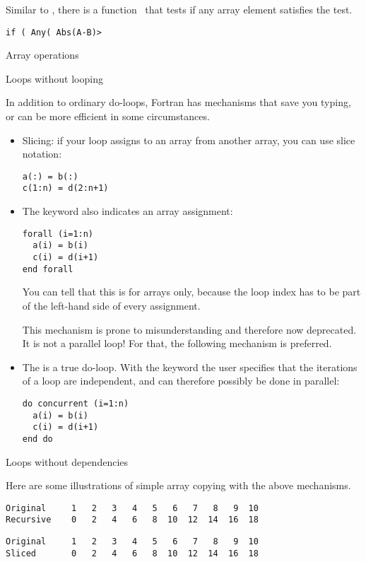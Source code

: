 Similar to , there is a function~ that tests
if any array element satisfies the test.
\begin{verbatim}
if ( Any( Abs(A-B)>
\end{verbatim}

 {Array operations}

 {Loops without looping}

In addition to ordinary do-loops, Fortran has mechanisms that save you
typing, or can be more efficient in some circumstances.
\begin{itemize}
\item Slicing: if your loop assigns to an array from another array,
  you can use slice notation:
\begin{verbatim}
a(:) = b(:)
c(1:n) = d(2:n+1)
\end{verbatim}
\item The  keyword also indicates an array assignment:
\begin{verbatim}
forall (i=1:n)
  a(i) = b(i)
  c(i) = d(i+1)
end forall
\end{verbatim}
You can tell that this is for arrays only, because the loop index has
to be part of the left-hand side of every assignment.

This mechanism is prone to misunderstanding and therefore now
deprecated.
It is not a parallel loop! For that, the following mechanism is preferred.
\item The  is a true do-loop. With the
   keyword the user specifies that the
  iterations of a loop are independent, and can therefore possibly be
  done in parallel:
\begin{verbatim}
do concurrent (i=1:n)
  a(i) = b(i)
  c(i) = d(i+1)
end do
\end{verbatim}
\end{itemize}

 {Loops without dependencies}

Here are some illustrations of simple array copying with the above
mechanisms.

\begin{verbatim}
Original     1   2   3   4   5   6   7   8   9  10
Recursive    0   2   4   6   8  10  12  14  16  18
\end{verbatim}

\begin{verbatim}
Original     1   2   3   4   5   6   7   8   9  10
Sliced       0   2   4   6   8  10  12  14  16  18
\end{verbatim}

